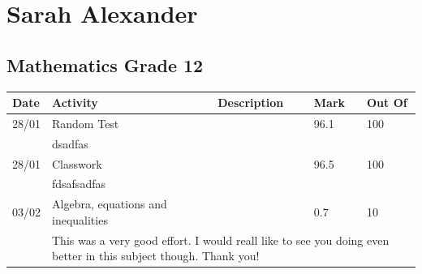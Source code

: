 \documentclass[11pt,a4paper,openright]{book}
\begin{document}
\section*{Sarah Alexander}
\subsection*{Mathematics Grade 12}
\begin{table}[h]
\begin{tabular}{ | p{1.5cm} | p{5.8cm} | p{5.8cm} | p{1.5cm} | p{1.5cm} |}
\rowcolor[HTML]{C0C0C0} \hline
\textbf{Date} & \textbf{Activity} & \textbf{Description} & \textbf{Mark} & \textbf{Out Of} \\ \hline 
\rowcolor[HTML]{9B9B9B}28/01 & Random Test &  & 96.1 & 100 \\ \hline 
 & \multicolumn{4}{m{12cm}|}{dsadfas}  \\ \hline 
\rowcolor[HTML]{9B9B9B}28/01 & Classwork &  & 96.5 & 100 \\ \hline 
 & \multicolumn{4}{m{12cm}|}{fdsafsadfas}  \\ \hline 
\rowcolor[HTML]{9B9B9B}03/02 & Algebra, equations and inequalities &  & 0.7 & 10 \\ \hline 
 & \multicolumn{4}{m{12cm}|}{This was a very good effort. I would reall like to see you doing even better in this subject though. Thank you!}  \\ \hline 
\end{tabular}
\end{table}
\end{document}
